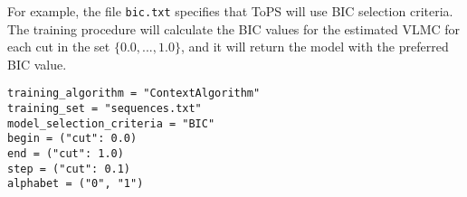 For example, the file \texttt{bic.txt} specifies that ToPS will use BIC selection criteria. The training procedure will calculate the BIC values for the estimated VLMC for each  cut in the set $\{0.0,...,1.0\}$, and it will return the model with the preferred BIC value.


\vspace{1em}
\begin{minipage}{\textwidth}
\begin{Verbatim}[frame=single,  label={bic.txt}]
training_algorithm = "ContextAlgorithm"
training_set = "sequences.txt"
model_selection_criteria = "BIC"
begin = ("cut": 0.0)
end = ("cut": 1.0)
step = ("cut": 0.1)
alphabet = ("0", "1")
\end{Verbatim}
\end{minipage}
\vspace{1em}

